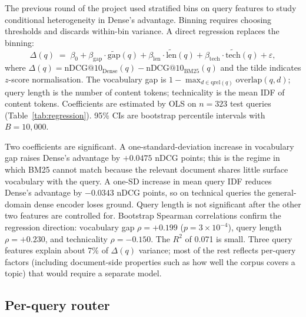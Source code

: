 \documentclass[11pt,a4paper]{article}
\begin{document}
The previous round of the project used stratified bins on query
features to study conditional heterogeneity in Dense's advantage.
Binning requires choosing thresholds and discards within-bin variance.
A direct regression replaces the binning:
\begin{equation}
    \Delta(q) \;=\; \beta_0
    + \beta_{\text{gap}} \cdot \widetilde{\text{gap}}(q)
    + \beta_{\text{len}} \cdot \widetilde{\text{len}}(q)
    + \beta_{\text{tech}} \cdot \widetilde{\text{tech}}(q)
    + \varepsilon,
    \label{eq:delta_regression}
\end{equation}
where $\Delta(q) = \text{nDCG@10}_{\text{Dense}}(q) -
\text{nDCG@10}_{\text{BM25}}(q)$ and the tilde indicates $z$-score
normalisation. The vocabulary gap is
$1 - \max_{d \in \text{qrel}(q)} \text{overlap}(q, d)$; query length is
the number of content tokens; technicality is the mean IDF of content
tokens. Coefficients are estimated by OLS on $n=323$ test queries
(Table~\ref{tab:regression}). 95\% CIs are bootstrap percentile
intervals with $B=10{,}000$.

\begin{table}[ht]
    \centering
    \caption{OLS regression of $\Delta(q) = $ Dense $-$ BM25 per-query
    nDCG@10 on standardised query features. All features are $z$-scored,
    so coefficient sizes are comparable.}
    \label{tab:regression}
    \small
    
\end{table}

Two coefficients are significant. A one-standard-deviation increase in
vocabulary gap raises Dense's advantage by $+0.0475$ nDCG points; this
is the regime in which BM25 cannot match because the relevant document
shares little surface vocabulary with the query. A one-SD increase in
mean query IDF reduces Dense's advantage by $-0.0343$ nDCG points, so
on technical queries the general-domain dense encoder loses ground.
Query length is not significant after the other two features are
controlled for. Bootstrap Spearman correlations confirm the regression
direction: vocabulary gap $\rho=+0.199$ ($p=3\!\times\!10^{-4}$), query
length $\rho=+0.230$, and technicality $\rho=-0.150$. The $R^2$ of
0.071 is small. Three query features explain about 7\% of $\Delta(q)$
variance; most of the rest reflects per-query factors (including
document-side properties such as how well the corpus covers a topic)
that would require a separate model.

\subsection{Per-query router}
\label{subsec:router}
\end{document}

